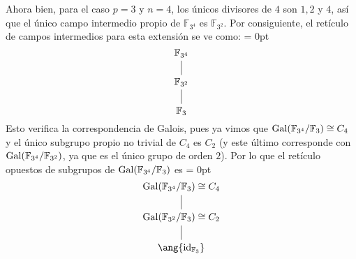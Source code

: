 \begin{sol}
\begin{enumerate}[label=\alph*)]
Ahora bien, para el caso $p=3$ y $n=4$, los únicos divisores de $4$ son $1,2$ y $4$, así que el único campo intermedio propio de $\mathbb{F}_{3^4}$ es $\mathbb{F}_{3^2}$. Por consiguiente, el retículo de campos intermedios para esta extensión se ve como:
{\mathsurround = 0pt
\[\begin{tikzcd}[cramped, sep=1.5em]
	{\mathbb{F}_{3^4}} \\
	{\mathbb{F}_{3^2}} \\
	{\mathbb{F}_{3}}
	\arrow[no head, from=1-1, to=2-1]
	\arrow[no head, from=2-1, to=3-1]
\end{tikzcd}\]
}
Esto verifica la correspondencia de Galois, pues ya vimos que $\operatorname{Gal}(\mathbb{F}_{3^4}/\mathbb{F}_{3}) \cong C_4$ y el único subgrupo propio no trivial de $C_4$ es $C_2$ (y este último corresponde con $\operatorname{Gal}(\mathbb{F}_{3^4}/\mathbb{F}_{3^2})$, ya que es el único grupo de orden $2$). Por lo que el retículo opuestos de subgrupos de $\operatorname{Gal}(\mathbb{F}_{3^4}/\mathbb{F}_{3})$ es 
{\mathsurround = 0pt
\[\begin{tikzcd}[cramped, sep=1.5em]
	{\gal(\mathbb{F}_{3^4}/\mathbb{F}_{3}) \cong C_4} \\
	{\gal(\mathbb{F}_{3^2}/\mathbb{F}_{3}) \cong C_2} \\
	{\ang{\id_{\mathbb{F}_3}}}
	\arrow[no head, from=1-1, to=2-1]
	\arrow[no head, from=2-1, to=3-1]
\end{tikzcd}\]
}
\end{enumerate}
\end{sol}

